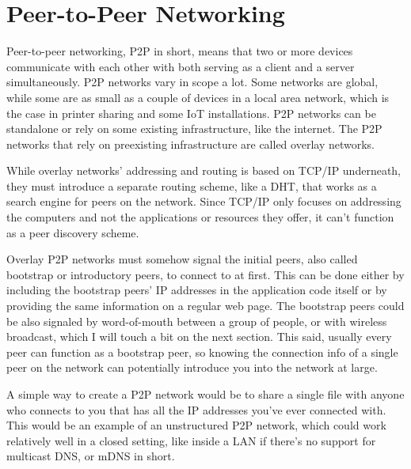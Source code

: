 \chapter{Peer-to-Peer Networking}
\label{Peer-to-Peer Networking}
Peer-to-peer networking, P2P in short, means that two or more devices communicate with each other with both serving as a client and a server simultaneously. P2P networks vary in scope a lot. Some networks are global, while some are as small as a couple of devices in a local area network, which is the case in printer sharing and some IoT installations. P2P networks can be standalone or rely on some existing infrastructure, like the internet. The P2P networks that rely on preexisting infrastructure are called overlay networks.

While overlay networks' addressing and routing is based on TCP/IP underneath, they must introduce a separate routing scheme, like a DHT, that works as a search engine for peers on the network. Since TCP/IP only focuses on addressing the computers and not the applications or resources they offer, it can't function as a peer discovery scheme.

Overlay P2P networks must somehow signal the initial peers, also called bootstrap or introductory peers, to connect to at first. This can be done either by including the bootstrap peers' IP addresses in the application code itself or by providing the same information on a regular web page. The bootstrap peers could be also signaled by word-of-mouth between a group of people, or with wireless broadcast, which I will touch a bit on the next section. This said, usually every peer can function as a bootstrap peer, so knowing the connection info of a single peer on the network can potentially introduce you into the network at large.

A simple way to create a P2P network would be to share a single file with anyone who connects to you that has all the IP addresses you've ever connected with. This would be an example of an unstructured P2P network, which could work relatively well in a closed setting, like inside a LAN if there's no support for multicast DNS, or mDNS in short.

